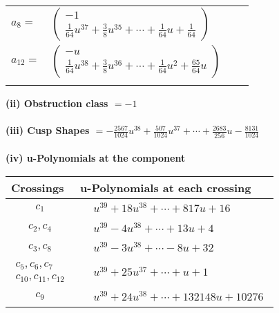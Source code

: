 \documentclass[1p]{elsarticle_modified}
\theoremstyle{definition}
\begin{document}
\begin{tabular}{m{7pt} m{180pt} m{7pt} m{180pt} }
\flushright $a_{8}=$&$\begin{pmatrix}-1\\\frac{1}{64} u^{37}+\frac{3}{8} u^{35}+\cdots+\frac{1}{64} u+\frac{1}{64}\end{pmatrix}$ \\
\flushright $a_{12}=$&$\begin{pmatrix}- u\\\frac{1}{64} u^{38}+\frac{3}{8} u^{36}+\cdots+\frac{1}{64} u^2+\frac{65}{64} u\end{pmatrix}$\\&\end{tabular}
\flushleft \textbf{(ii) Obstruction class $= -1$}\\~\\
\flushleft \textbf{(iii) Cusp Shapes $= -\frac{2567}{1024} u^{38}+\frac{507}{1024} u^{37}+\cdots+\frac{2683}{256} u-\frac{8131}{1024}$}\\~\\
\newpage\renewcommand{\arraystretch}{1}
\flushleft \textbf{(iv) u-Polynomials at the component}\newline \\
\begin{tabular}{m{50pt}|m{274pt}}
Crossings & \hspace{64pt}u-Polynomials at each crossing \\
\hline $$\begin{aligned}c_{1}\end{aligned}$$&$\begin{aligned}
&u^{39}+18 u^{38}+\cdots+817 u+16
\end{aligned}$\\
\hline $$\begin{aligned}c_{2},c_{4}\end{aligned}$$&$\begin{aligned}
&u^{39}-4 u^{38}+\cdots+13 u+4
\end{aligned}$\\
\hline $$\begin{aligned}c_{3},c_{8}\end{aligned}$$&$\begin{aligned}
&u^{39}-3 u^{38}+\cdots-8 u+32
\end{aligned}$\\
\hline $$\begin{aligned}c_{5},c_{6},c_{7}\\c_{10},c_{11},c_{12}\end{aligned}$$&$\begin{aligned}
&u^{39}+25 u^{37}+\cdots+u+1
\end{aligned}$\\
\hline $$\begin{aligned}c_{9}\end{aligned}$$&$\begin{aligned}
&u^{39}+24 u^{38}+\cdots+132148 u+10276
\end{aligned}$\\
\hline
\end{tabular}\\~\\
\end{document}
